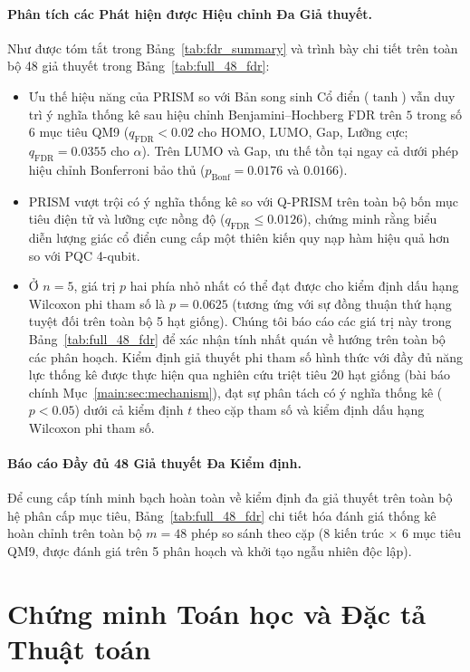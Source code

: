 \documentclass[10pt,twocolumn,letterpaper]{article}
\begin{document}
\paragraph{Phân tích các Phát hiện được Hiệu chỉnh Đa Giả thuyết.}
Như được tóm tắt trong Bảng~\ref{tab:fdr_summary} và trình bày chi tiết trên toàn bộ 48 giả thuyết trong Bảng~\ref{tab:full_48_fdr}:
\begin{itemize}
    \item Ưu thế hiệu năng của PRISM so với Bản song sinh Cổ điển ($\tanh$) vẫn duy trì ý nghĩa thống kê sau hiệu chỉnh Benjamini--Hochberg FDR trên $5$ trong số $6$ mục tiêu QM9 ($q_{\mathrm{FDR}} < 0.02$ cho HOMO, LUMO, Gap, Lưỡng cực; $q_{\mathrm{FDR}} = 0.0355$ cho $\alpha$). Trên LUMO và Gap, ưu thế tồn tại ngay cả dưới phép hiệu chỉnh Bonferroni bảo thủ ($p_{\mathrm{Bonf}} = 0.0176$ và $0.0166$).
    \item PRISM vượt trội có ý nghĩa thống kê so với Q-PRISM trên toàn bộ bốn mục tiêu điện tử và lưỡng cực nồng độ ($q_{\mathrm{FDR}} \le 0.0126$), chứng minh rằng biểu diễn lượng giác cổ điển cung cấp một thiên kiến quy nạp hàm hiệu quả hơn so với PQC 4-qubit.
    \item Ở $n = 5$, giá trị $p$ hai phía nhỏ nhất có thể đạt được cho kiểm định dấu hạng Wilcoxon phi tham số là $p = 0.0625$ (tương ứng với sự đồng thuận thứ hạng tuyệt đối trên toàn bộ 5 hạt giống). Chúng tôi báo cáo các giá trị này trong Bảng~\ref{tab:full_48_fdr} để xác nhận tính nhất quán về hướng trên toàn bộ các phân hoạch. Kiểm định giả thuyết phi tham số hình thức với đầy đủ năng lực thống kê được thực hiện qua nghiên cứu triệt tiêu 20 hạt giống (bài báo chính Mục~\ref{main:sec:mechanism}), đạt sự phân tách có ý nghĩa thống kê ($p < 0.05$) dưới cả kiểm định $t$ theo cặp tham số và kiểm định dấu hạng Wilcoxon phi tham số.
\end{itemize}

\paragraph{Báo cáo Đầy đủ 48 Giả thuyết Đa Kiểm định.}
Để cung cấp tính minh bạch hoàn toàn về kiểm định đa giả thuyết trên toàn bộ hệ phân cấp mục tiêu, Bảng~\ref{tab:full_48_fdr} chi tiết hóa đánh giá thống kê hoàn chỉnh trên toàn bộ $m = 48$ phép so sánh theo cặp ($8$ kiến trúc $\times$ $6$ mục tiêu QM9, được đánh giá trên 5 phân hoạch và khởi tạo ngẫu nhiên độc lập).



\section{Chứng minh Toán học và Đặc tả Thuật toán}
\label{sm:proof}
\label{sm:pseudocode}
\end{document}
